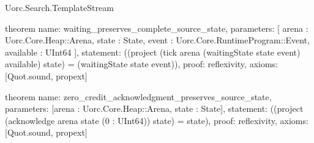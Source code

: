 \begin{lexlean}{Uorc.Search.TemplateStream}
\begin{semanticmodule}
theorem{
  name: waiting_preserves_complete_source_state,
  parameters: [
    arena : Uorc.Core.Heap::Arena,
    state : State,
    event : Uorc.Core.RuntimeProgram::Event,
    available : UInt64
  ],
  statement: ((project (tick arena (waitingState state event) available) state) = (waitingState state event)),
  proof: reflexivity{},
  axioms: [Quot.sound, propext]
}

theorem{
  name: zero_credit_acknowledgment_preserves_source_state,
  parameters: [arena : Uorc.Core.Heap::Arena, state : State],
  statement: ((project (acknowledge arena state (0 : UInt64)) state) = state),
  proof: reflexivity{},
  axioms: [Quot.sound, propext]
}
\end{semanticmodule}
\end{lexlean}
